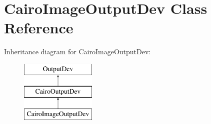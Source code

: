 \hypertarget{class_cairo_image_output_dev}{}\section{Cairo\+Image\+Output\+Dev Class Reference}
\label{class_cairo_image_output_dev}
Inheritance diagram for Cairo\+Image\+Output\+Dev\+:\begin{figure}[H]
\begin{center}
\leavevmode
\includegraphics[height=3.000000cm]{class_cairo_image_output_dev}
\end{center}
\end{figure}
